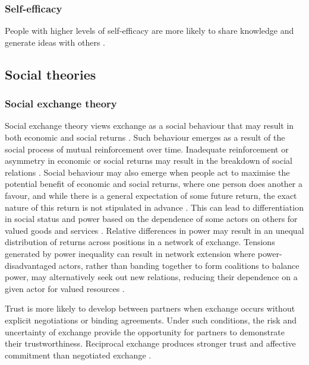 \subsubsection{Self-efficacy}

People with higher levels of self-efficacy are more likely to share knowledge and generate ideas with others \citep{tierney2002creative,lin2007effects}. 


\subsection{Social theories}

\subsubsection{Social exchange theory}

Social exchange theory views exchange as a social behaviour that may result in both economic and social returns \citep{lambe2001social}. Such behaviour emerges as a result of the social process of mutual reinforcement over time. Inadequate reinforcement or asymmetry in economic or social returns may result in the breakdown of social relations \citep{homans1961social}. Social behaviour may also emerge when people act to maximise the potential benefit of economic and social returns, where one person does another a favour, and while there is a general expectation of some future return, the exact nature of this return is not stipulated in advance \citep{blau1986exchange}. This can lead to differentiation in social status and power based on the dependence of some actors on others for valued goods and services \citep{emerson1962power}. Relative differences in power may result in an unequal distribution of returns across positions in a network of exchange. Tensions generated by power inequality can result in network extension where power-disadvantaged actors, rather than banding together to form coalitions to balance power, may alternatively seek out new relations, reducing their dependence on a given actor for valued resources \citep{cook2013social}. 

Trust is more likely to develop between partners when exchange occurs without explicit negotiations or binding agreements. Under such conditions, the risk and uncertainty of exchange provide the opportunity for partners to demonstrate their trustworthiness. Reciprocal exchange produces stronger trust and affective commitment than negotiated exchange \citep{molm2000risk}. 

